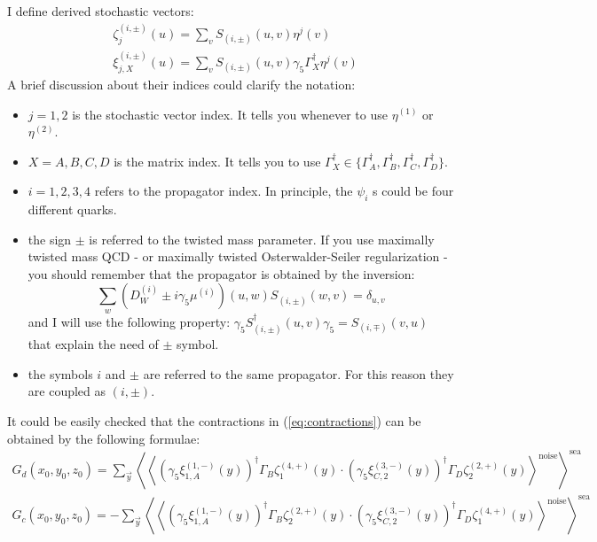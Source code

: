\documentclass[11pt,a4paper]{article}
\begin{document}
I define derived stochastic vectors:
\begin{equation}
    \begin{aligned}
        & \zeta^{(i,\pm)}_{j} (u) = \sum_{v} S_{(i,\pm)}(u,v)\eta^{j}(v) \\
        & \xi^{(i,\pm)}_{j,X} (u) = \sum_{v} S_{(i,\pm)}(u,v) \gamma_5 \Gamma_X^\dag \eta^{j}(v)
    \end{aligned}
\end{equation}
A brief discussion about their indices could clarify the notation:
\begin{itemize}
    \item   $j=1,2$ is the stochastic vector index. It tells you whenever to use $\eta^{(1)}$ or $\eta^{(2)}$.
    \item   $X=A,B,C,D$ is the matrix index. It tells you to use $\Gamma_X^\dag \in \{\Gamma_A^\dag,\Gamma_B^\dag,\Gamma_C^\dag,\Gamma_D^\dag\}$.
    \item   $i=1,2,3,4$ refers to the propagator index. In principle, the $\psi_i$ s could be four different quarks.
    \item   the sign $\pm$ is referred to the twisted mass parameter. If you use maximally twisted mass QCD - or maximally twisted Osterwalder-Seiler regularization - you should remember that the propagator is obtained by the inversion:
               $$\sum_{w} \left(D_W^{(i)} \pm i\gamma_5\mu^{(i)}\right)(u,w) S_{(i,\pm)}(w,v) = \delta_{u,v}$$ 
            and I will use the following property: $\gamma_5 S_{(i,\pm)}^\dag(u,v) \gamma_5 = S_{(i,\mp)}(v,u)$ that explain the need of $\pm$ symbol.
    \item   the symbols $i$ and $\pm$ are referred to the same propagator. For this reason they are coupled as $(i,\pm)$.
\end{itemize}
It could be easily checked that the contractions in (\ref{eq:contractions}) can be obtained by the following formulae:
\begin{equation*}
    \begin{gathered}
        G_d(x_0,y_0,z_0) =   \sum_{\vec y} \left\langle \left\langle \left(\gamma_5\xi^{(1,-)}_{1,A} (y) \right)^\dag \Gamma_B \zeta^{(4,+)}_1 (y) \cdot \left(\gamma_5\xi^{(3,-)}_{C,2} (y) \right)^\dag \Gamma_D \zeta^{(2,+)}_2 (y) \right\rangle^\text{noise} \right\rangle^{\text{sea}} \\
        G_c(x_0,y_0,z_0) = - \sum_{\vec y} \left\langle \left\langle \left(\gamma_5\xi^{(1,-)}_{1,A} (y) \right)^\dag \Gamma_B \zeta^{(2,+)}_2 (y) \cdot \left(\gamma_5\xi^{(3,-)}_{C,2} (y) \right)^\dag \Gamma_D \zeta^{(4,+)}_1 (y) \right\rangle^\text{noise} \right\rangle^{\text{sea}}
    \end{gathered}
\end{equation*}
\end{document}
